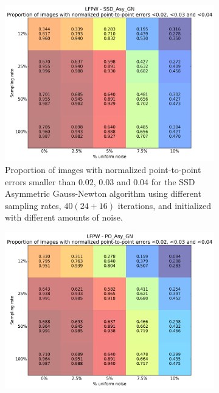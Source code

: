 \begin{figure}[h!]
	\centering
	\begin{subfigure}{0.48\textwidth}
	    \includegraphics[width=\textwidth]{experiments/sampling/sampling_vs_noise_ssd_asy_gn.png}
	    \caption{Proportion of images with normalized point-to-point errors smaller than $0.02$, $0.03$ and $0.04$ for the SSD Asymmetric Gauss-Newton algorithm using different sampling rates, $40 (24 + 16)$ iterations, and initialized with different amounts of noise.}
	    \label{fig:sampling_vs_noise_ssd_asy_gn}
	\end{subfigure}
	\hfill
	\begin{subfigure}{0.48\textwidth}
	    \includegraphics[width=\textwidth]{experiments/sampling/sampling_vs_noise_po_asy_gn.png}

\end{subfigure}
\end{figure}

